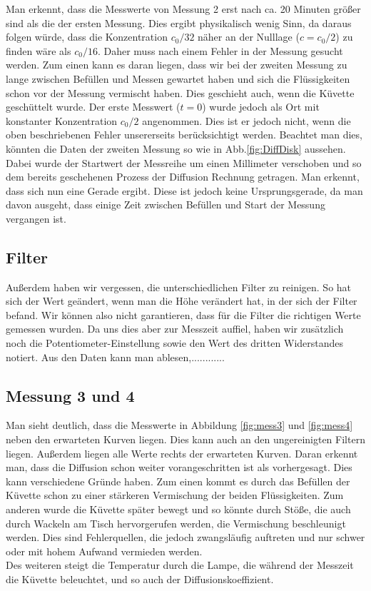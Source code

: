 \documentclass[12pt,a4paper,titlepage,headinclude,bibtotoc]{scrartcl}
\begin{document}
Man erkennt, dass die Messwerte von Messung 2  erst nach ca. 20 Minuten größer sind als die der ersten Messung.
Dies ergibt physikalisch wenig Sinn, da daraus folgen würde, dass die Konzentration $c_0/32$ näher an der Nulllage ($c=c_0/2$) zu finden wäre als $c_0/16$. 
Daher muss nach einem Fehler in der Messung gesucht werden.
Zum einen kann es daran liegen, dass wir bei der zweiten Messung zu lange zwischen Befüllen und Messen gewartet haben und sich die Flüssigkeiten schon vor der Messung vermischt haben.
Dies geschieht auch, wenn die Küvette geschüttelt wurde.
Der erste Messwert ($t=0$) wurde jedoch als Ort mit konstanter Konzentration $c_0/2$ angenommen.
Dies ist er jedoch nicht, wenn die oben beschriebenen Fehler unsererseits berücksichtigt werden.
Beachtet man dies, könnten die Daten der zweiten Messung so wie in Abb.\ref{fig:DiffDisk} aussehen.
Dabei wurde der Startwert der Messreihe um einen Millimeter verschoben und so dem bereits geschehenen Prozess der Diffusion Rechnung getragen.
Man erkennt, dass sich nun eine Gerade ergibt. Diese ist jedoch keine Ursprungsgerade, da man davon ausgeht, dass einige Zeit zwischen Befüllen und Start der Messung vergangen ist.

\subsection{Filter}
Außerdem haben wir vergessen, die unterschiedlichen Filter zu reinigen.
So hat sich der Wert geändert, wenn man die Höhe verändert hat, in der sich der Filter befand.
Wir können also nicht garantieren, dass für die Filter die richtigen Werte gemessen wurden.
Da uns dies aber zur Messzeit auffiel, haben wir zusätzlich noch die Potentiometer-Einstellung sowie den Wert des dritten Widerstandes notiert.
Aus den Daten kann man ablesen,............

\subsection{Messung 3 und 4}
Man sieht deutlich, dass die Messwerte in Abbildung \ref{fig:mess3} und \ref{fig:mess4} neben den erwarteten Kurven liegen.
Dies kann auch an den ungereinigten Filtern liegen.
Außerdem liegen alle Werte rechts der erwarteten Kurven.
Daran erkennt man, dass die Diffusion schon weiter vorangeschritten ist als vorhergesagt.
Dies kann verschiedene Gründe haben.
Zum einen kommt es durch das Befüllen der Küvette schon zu einer stärkeren Vermischung der beiden Flüssigkeiten. 
Zum anderen wurde die Küvette später bewegt und so könnte durch Stöße, die auch durch Wackeln am Tisch hervorgerufen werden, die Vermischung beschleunigt werden.
Dies sind Fehlerquellen, die jedoch zwangsläufig auftreten und nur schwer oder mit hohem Aufwand vermieden werden.\\
Des weiteren steigt die Temperatur durch die Lampe, die während der Messzeit die Küvette beleuchtet, und so auch der Diffusionskoeffizient.
\end{document}
